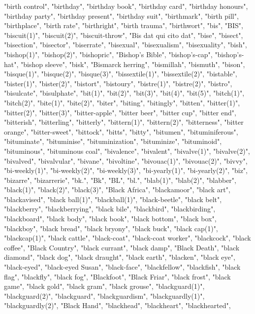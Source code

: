 "birth control",
"birthday",
"birthday book",
"birthday card",
"birthday honours",
"birthday party",
"birthday present",
"birthday suit",
"birthmark",
"birth pill",
"birthplace",
"birth rate",
"birthright",
"birth trauma",
"birthwort",
"bis",
"BIS",
"biscuit(1)",
"biscuit(2)",
"biscuit-throw",
"Bis dat qui cito dat",
"bise",
"bisect",
"bisection",
"bisector",
"biserrate",
"bisexual",
"bisexualism",
"bisexuality",
"bish",
"bishop(1)",
"bishop(2)",
"bishopric",
"Bishop's Bible",
"bishop's-cap",
"bishop's-hat",
"bishop sleeve",
"bisk",
"Bismarck herring",
"bismillah",
"bismuth",
"bison",
"bisque(1)",
"bisque(2)",
"bisque(3)",
"bissextile(1)",
"bissextile(2)",
"bistable",
"bister(1)",
"bister(2)",
"bistort",
"bistoury",
"bistre(1)",
"bistre(2)",
"bistro",
"bisulcate",
"bisulphate",
"bit(1)",
"bit(2)",
"bit(3)",
"bit(4)",
"bit(5)",
"bitch(1)",
"bitch(2)",
"bite(1)",
"bite(2)",
"biter",
"biting",
"bitingly",
"bitten",
"bitter(1)",
"bitter(2)",
"bitter(3)",
"bitter-apple",
"bitter beer",
"bitter cup",
"bitter end",
"bitterish",
"bitterling",
"bitterly",
"bittern(1)",
"bittern(2)",
"bitterness",
"bitter orange",
"bitter-sweet",
"bittock",
"bitts",
"bitty",
"bitumen",
"bituminiferous",
"bituminate",
"bituminise",
"bituminization",
"bituminize",
"bituminoid",
"bituminous",
"bituminous coal",
"bivalence",
"bivalent",
"bivalve(1)",
"bivalve(2)",
"bivalved",
"bivalvular",
"bivane",
"bivoltine",
"bivouac(1)",
"bivouac(2)",
"bivvy",
"bi-weekly(1)",
"bi-weekly(2)",
"bi-weekly(3)",
"bi-yearly(1)",
"bi-yearly(2)",
"biz",
"bizarre",
"bizarrerie",
"bk.",
"Bk",
"BL",
"bl.",
"blab(1)",
"blab(2)",
"blabber",
"black(1)",
"black(2)",
"black(3)",
"Black Africa",
"blackamoor",
"black art",
"blackavised",
"black ball(1)",
"blackball(1)",
"black-beetle",
"black belt",
"blackberry",
"blackberrying",
"black bile",
"blackbird",
"blackbirding",
"blackboard",
"black body",
"black book",
"black bottom",
"black box",
"blackboy",
"black bread",
"black bryony",
"black buck",
"black cap(1)",
"blackcap(1)",
"black cattle",
"black-coat",
"black-coat worker",
"blackcock",
"black coffee",
"Black Country",
"black currant",
"black damp",
"Black Death",
"black diamond",
"black dog",
"black draught",
"black earth",
"blacken",
"black eye",
"black-eyed",
"black-eyed Susan",
"black-face",
"blackfellow",
"blackfish",
"black flag",
"blackfly",
"black fog",
"Blackfoot",
"Black Friar",
"black frost",
"black game",
"black gold",
"black gram",
"black grouse",
"blackguard(1)",
"blackguard(2)",
"blackguard",
"blackguardism",
"blackguardly(1)",
"blackguardly(2)",
"Black Hand",
"blackhead",
"blackheart",
"blackhearted",
